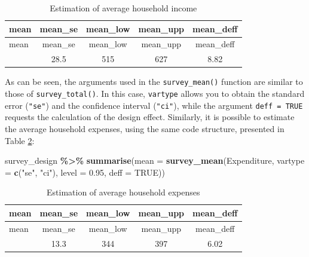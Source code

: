 \documentclass[
  english,
  12pt,
]{book}
\newenvironment{Shaded}{\begin{snugshade}}{\end{snugshade}}
\newcommand{\AttributeTok}[1]{\textcolor[rgb]{0.13,0.29,0.53}{#1}}
\newcommand{\ConstantTok}[1]{\textcolor[rgb]{0.56,0.35,0.01}{#1}}
\newcommand{\FloatTok}[1]{\textcolor[rgb]{0.00,0.00,0.81}{#1}}
\newcommand{\FunctionTok}[1]{\textcolor[rgb]{0.13,0.29,0.53}{\textbf{#1}}}
\newcommand{\NormalTok}[1]{#1}
\newcommand{\SpecialCharTok}[1]{\textcolor[rgb]{0.81,0.36,0.00}{\textbf{#1}}}
\newcommand{\StringTok}[1]{\textcolor[rgb]{0.31,0.60,0.02}{#1}}
\begin{document}
\begin{longtable}[]{@{}lcccc@{}}
\caption{\label{tab:tab-media-ingreso}Estimation of average household income}\tabularnewline
\toprule\noalign{}
mean & mean\_se & mean\_low & mean\_upp & mean\_deff \\
\midrule\noalign{}
\endfirsthead
\toprule\noalign{}
mean & mean\_se & mean\_low & mean\_upp & mean\_deff \\
\midrule\noalign{}
\endhead
\bottomrule\noalign{}
\endlastfoot
571 & 28.5 & 515 & 627 & 8.82 \\
\end{longtable}

As can be seen, the arguments used in the \texttt{survey\_mean()} function are similar to those of \texttt{survey\_total()}. In this case, \texttt{vartype} allows you to obtain the standard error (\texttt{"se"}) and the confidence interval (\texttt{"ci"}), while the argument \texttt{deff\ =\ TRUE} requests the calculation of the design effect. Similarly, it is possible to estimate the average household expenses, using the same code structure, presented in Table \ref{tab:tab-media-gasto}:

\begin{Shaded}
\begin{Highlighting}[]
\NormalTok{survey\_design }\SpecialCharTok{\%\textgreater{}\%}
  \FunctionTok{summarise}\NormalTok{(}\AttributeTok{mean =} \FunctionTok{survey\_mean}\NormalTok{(Expenditure,}
                                    \AttributeTok{vartype =} \FunctionTok{c}\NormalTok{(}\StringTok{"se"}\NormalTok{, }\StringTok{"ci"}\NormalTok{),}
                                    \AttributeTok{level =} \FloatTok{0.95}\NormalTok{,}
                                    \AttributeTok{deff =} \ConstantTok{TRUE}\NormalTok{))}
\end{Highlighting}
\end{Shaded}

\begin{longtable}[]{@{}lcccc@{}}
\caption{\label{tab:tab-media-gasto}Estimation of average household expenses}\tabularnewline
\toprule\noalign{}
mean & mean\_se & mean\_low & mean\_upp & mean\_deff \\
\midrule\noalign{}
\endfirsthead
\toprule\noalign{}
mean & mean\_se & mean\_low & mean\_upp & mean\_deff \\
\midrule\noalign{}
\endhead
\bottomrule\noalign{}
\endlastfoot
371 & 13.3 & 344 & 397 & 6.02 \\
\end{longtable}
\end{document}
